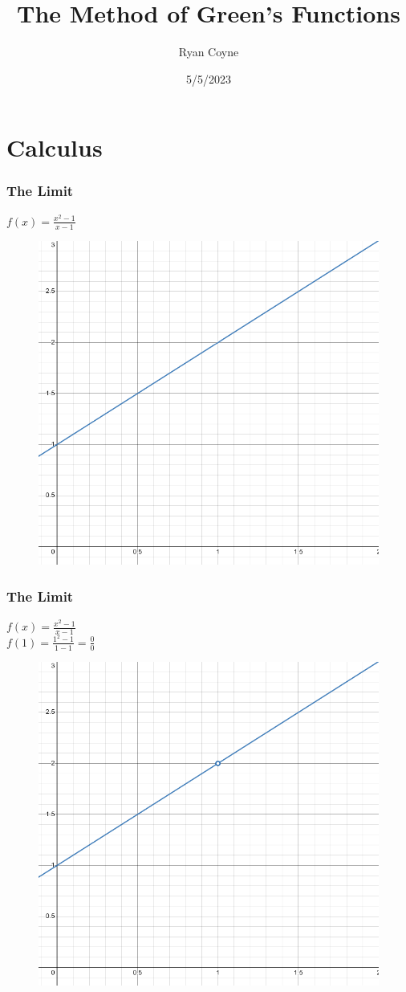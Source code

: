 \documentclass{beamer}
\title{The Method of Green's Functions}
\author{Ryan Coyne}
\institute[NHTI]{NHTI-Concord's Community College}
\date{5/5/2023}
\def\limfunc{\frac{x^2-1}{x-1}}
\begin{document}
\frame{\titlepage}

\section*{Calculus}

    \begin{frame}
    \frametitle{The Limit}
        \(f(x)=\limfunc\)\\[28.5pt]
        \begin{figure}
            \centering
            \includegraphics[width=0.6\linewidth]{include/images/limit_1.png}
        \end{figure}
    \end{frame}

    \begin{frame}
        \frametitle{The Limit}
        \(f(x)=\limfunc\)\\
        \(f(1)=\frac{1^2-1}{1-1}=\frac{0}{0}\)\\[12pt]
        \begin{figure}
            \centering
            \includegraphics[width=0.6\linewidth]{include/images/limit_2.png}
        \end{figure}
    \end{frame}
\end{document}
